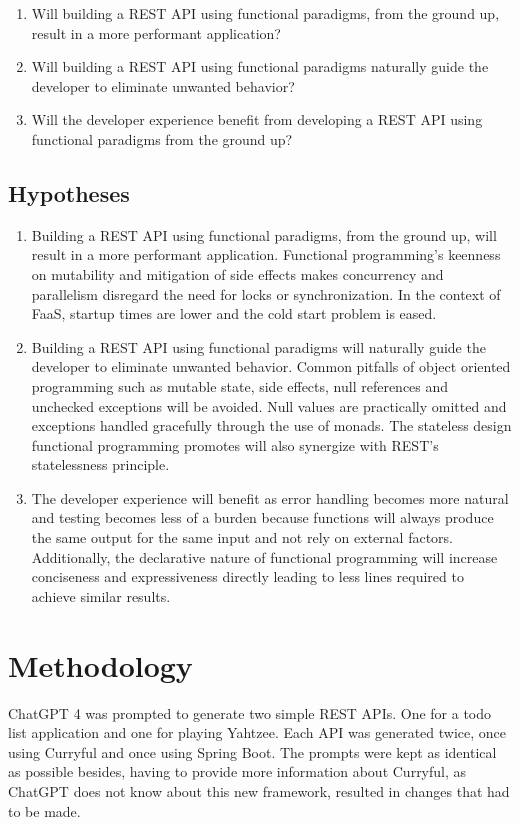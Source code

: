 \documentclass[a4paper,titlepage]{article}
\begin{document}
\begin{enumerate}
	\item Will building a REST API using functional paradigms, from the
	      ground up, result in a more performant application?
	\item Will building a REST API using functional paradigms naturally
	      guide the developer to eliminate unwanted behavior?
	\item Will the developer experience benefit from developing a REST API using
	      functional paradigms from the ground up?
\end{enumerate}

\subsection{Hypotheses}

\begin{enumerate}
	\item Building a REST API using functional paradigms, from the ground
	      up, will result in a more performant application. Functional
	      programming's keenness on mutability and mitigation of side effects
	      makes concurrency and parallelism disregard the need for locks or
	      synchronization. In the context of FaaS, startup times are lower
	      and the cold start problem is eased.
	\item Building a REST API using functional paradigms will naturally guide
	      the developer to eliminate unwanted behavior. Common pitfalls of
	      object oriented programming such as mutable state, side effects,
	      null references and unchecked exceptions will be avoided. Null
	      values are practically omitted and exceptions handled gracefully
	      through the use of monads. The stateless design functional
	      programming promotes will also synergize with REST's statelessness
	      principle.
	\item The developer experience will benefit as error handling becomes more
	      natural and testing becomes less of a burden because functions will
	      always produce the same output for the same input and not rely on
	      external factors. Additionally, the declarative nature of functional
	      programming will increase conciseness and expressiveness directly
	      leading to less lines required to achieve similar results.
\end{enumerate}

\section{Methodology}
ChatGPT 4 was prompted to generate two simple REST APIs. One for a todo list
application and one for playing Yahtzee. Each API was generated twice, once
using Curryful and once using Spring Boot. The prompts were kept as identical as
possible besides, having to provide more information about Curryful, as ChatGPT
does not know about this new framework, resulted in changes that had to be made.
\end{document}
